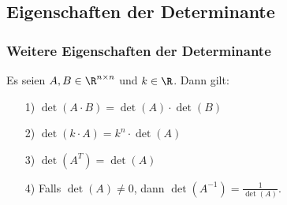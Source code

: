 \subsection{Eigenschaften der Determinante}
%
\begin{frame}\frametitle{Weitere Eigenschaften der Determinante}
Es seien $A,B \in \R^{n\times n}$ und $k \in \R$. Dann gilt: \pause\vfill
\begin{itemize}
\item[1)] $\det(A\cdot B)=\det(A) \cdot \det (B)$\pause\vfill
\item[2)] $\det(k\cdot A)=k^n\cdot \det(A)$\pause\vfill
\item[3)] $\det(A^T)=\det(A)$\pause\vfill
\item[4)] Falls $\det(A)\ne0$, dann $\det(A^{-1})=\frac{1}{\det(A)}$.
\end{itemize}
\end{frame}
%
